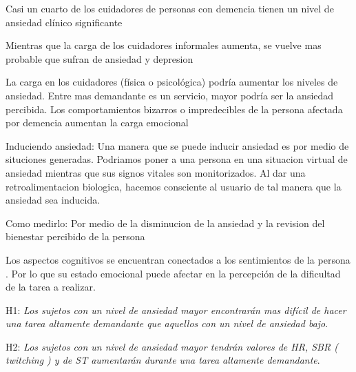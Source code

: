 \documentclass[letterpaper,12pt]{cicese}
\begin{document}
		Casi un cuarto de los cuidadores de personas con demencia tienen un nivel de ansiedad cl\'inico significante \citep{Cooper200615}

		Mientras que la carga de los cuidadores informales aumenta, se vuelve mas probable que sufran de ansiedad y depresion \citep{Denno20131731}

		La carga en los cuidadores (f\'isica o psicol\'ogica) podr\'ia aumentar los niveles de ansiedad. Entre mas demandante es un servicio, mayor podr\'ia ser la ansiedad percibida. Los comportamientos bizarros o impredecibles de la persona afectada por demencia aumentan la carga emocional \citep{Rosa201054}

		Induciendo ansiedad: Una manera que se puede inducir ansiedad es por medio de situciones generadas. Podriamos poner a una persona en una situacion virtual de ansiedad mientras que sus signos
		vitales son monitorizados. Al dar una retroalimentacion biologica, hacemos consciente al usuario de tal manera que la ansiedad sea inducida.

		Como medirlo: Por medio de la disminucion de la ansiedad y la revision del bienestar percibido de la persona
		
		Los aspectos cognitivos se encuentran conectados a los sentimientos de la persona \citep{Wilt2011987}. Por lo que su estado emocional puede afectar en la percepci\'on de la dificultad de la tarea a realizar.

		H1: \textit{Los sujetos con un nivel de ansiedad mayor encontrar\'an mas dif\'icil de hacer una tarea altamente demandante que aquellos con un nivel de ansiedad bajo}.
		

		H2: \textit{Los sujetos con un nivel de ansiedad mayor tendr\'an valores de HR, SBR ( twitching ) y  de ST aumentar\'an durante una tarea altamente demandante}.
		\newpage
		
\end{document}

